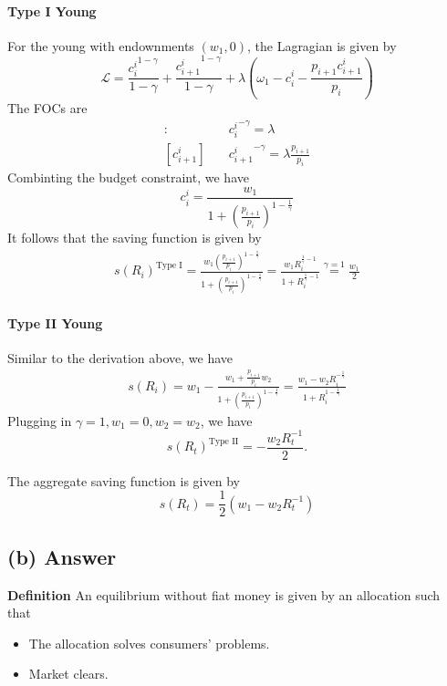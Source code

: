 \documentclass[11pt]{article}
\theoremstyle{definition}
\theoremstyle{boldtitle} %
\numberwithin{equation}{section}
\numberwithin{figure}{section}
\numberwithin{table}{section}
\begin{document}
\paragraph{Type I Young}
For the young with endownments $(w_1, 0)$, the Lagragian is given by 
\[
\mathcal{L} = \frac{{c^i_i}^{1-\gamma}}{1 - \gamma} + \frac{{c^i_{i+1}}^{1-\gamma}}{1 - \gamma} 
+ \lambda \left(\omega_1 - c_i^i - \frac{p_{i+1} c^i_{i+1}}{p_i} \right)
\]
The FOCs are
\begin{align*}
    [{c^i_i}]: \quad & {c^i_i}^{-\gamma} = \lambda \\
    [c^i_{i+1}] \quad & {c^i_{i+1}}^{-\gamma} = \lambda \frac{p_{i+1}}{p_i} 
\end{align*}
Combinting the budget constraint, we have 
\[
c_i^i = \frac{w_1}{1 + \left(\frac{p_{i+1}}{p_i} \right)^{1 -\frac{1}{\gamma}}}
\]
It follows that the saving function is given by 
\begin{align*}
    s(R_i)^\text{Type I} = \frac{w_1 \left(\frac{p_{i+1}}{p_i} \right)^{1 -\frac{1}{\gamma}}}{1 + \left(\frac{p_{i+1}}{p_i} \right)^{1 -\frac{1}{\gamma}}}  
    = \frac{w_1 R_i^{\frac{1}{\gamma} - 1}}{1 + R_i^{\frac{1}{\gamma} - 1}} 
    \stackrel{\gamma = 1}{=} \frac{w_1}{2}
\end{align*}

\paragraph{Type II Young}
Similar to the derivation above, we have 
\begin{align*}
s(R_i) = w_1 - \frac{w_1 + \frac{p_{i+1}}{p_i} w_2}{1 + \left(\frac{p_{i+1}}{p_i} \right)^{1-\frac{1}{\gamma}}} 
= \frac{w_1 - w_2 R_i^{-\frac{1}{\gamma}}}{1 + R_i^{1 - \frac{1}{\gamma}}}
\end{align*}
Plugging in $\gamma = 1, w_1 = 0, w_2 = w_2$, we have 
\[
s(R_t)^\text{Type II} = - \frac{w_2 R_t^{-1}}{2}.
\]

The aggregate saving function is given by 
\[
s(R_t) = \frac{1}{2} (w_1- w_2 R_t^{-1})
\]


\subsection{(b) Answer}
\textbf{Definition} An equilibrium without fiat money is given by an allocation such that 
\begin{itemize}
    \item The allocation solves consumers' problems.
    \item Market clears.
\end{itemize}
\end{document}
